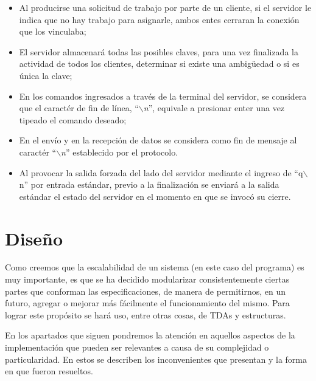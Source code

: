 \documentclass{article}
\begin{document}
\begin{itemize}
	\itemsep=3pt \topsep=0pt \partopsep=0pt \parskip=0pt \parsep=0pt

	\item Al producirse una solicitud de trabajo por parte de un cliente, si el servidor le indica que no hay trabajo para asignarle, ambos entes cerraran la conexión que los vinculaba;

	\item El servidor almacenará todas las posibles claves, para una vez finalizada la actividad de todos los clientes, determinar si existe una ambig\"uedad o si es única la clave;

	\item En los comandos ingresados a través de la terminal del servidor, se considera que el caractér de fin de línea, ``\textit{$\backslash$n}'', equivale a presionar enter una vez tipeado el comando deseado;

	\item En el envío y en la recepción de datos se considera como fin de mensaje al caractér ``\textit{$\backslash$n}'' establecido por el protocolo.

	\item Al provocar la salida forzada del lado del servidor mediante el ingreso de ``q$\backslash$n'' por entrada estándar, previo a la finalización se enviará a la salida estándar el estado del servidor en el momento en que se invocó su cierre.
\end{itemize}
\medskip




\section{Diseño}

	Como creemos que la escalabilidad de un sistema (en este caso del programa) es muy importante, es que se ha decidido modularizar consistentemente ciertas partes que conforman las especificaciones, de manera de permitirnos, en un futuro, agregar o mejorar más fácilmente el funcionamiento del mismo. Para lograr este propósito se hará uso, entre otras cosas, de TDAs y estructuras.
	\par
	En los apartados que siguen pondremos la atención en aquellos aspectos de la implementación que pueden ser relevantes a causa de su complejidad o particularidad. En estos se describen los inconvenientes que presentan y la forma en que fueron resueltos.
\bigskip
\end{document}
